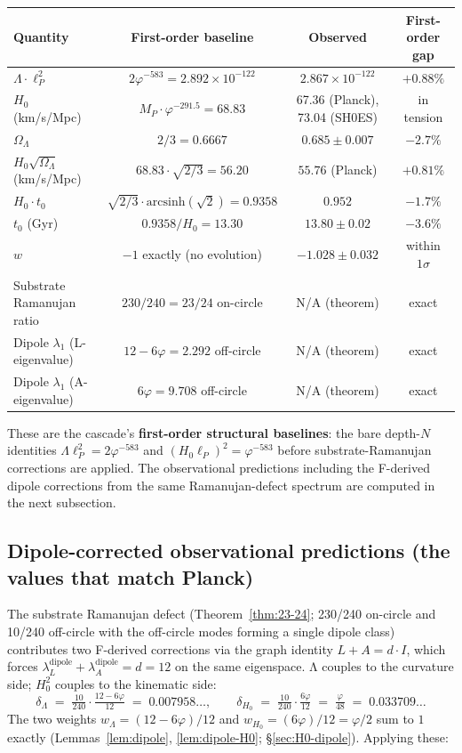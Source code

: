 \documentclass[11pt]{article}
\theoremstyle{plain}
\theoremstyle{definition}
\theoremstyle{remark}
\begin{document}
\begin{center}
\renewcommand{\arraystretch}{1.25}
\begin{tabular}{lccc}
\toprule
Quantity & First-order baseline & Observed & First-order gap \\
\midrule
$\Lambda \cdot \ell_P^2$ & $2\varphi^{-583} = 2.892 \times 10^{-122}$ & $2.867 \times 10^{-122}$ & $+0.88\%$ \\
$H_0$ (km/s/Mpc) & $M_P \cdot \varphi^{-291.5} = 68.83$ & 67.36 (Planck), 73.04 (SH0ES) & in tension \\
$\Omega_\Lambda$ & $2/3 = 0.6667$ & $0.685 \pm 0.007$ & $-2.7\%$ \\
$H_0 \sqrt{\Omega_\Lambda}$ (km/s/Mpc) & $68.83 \cdot \sqrt{2/3} = 56.20$ & $55.76$ (Planck) & $+0.81\%$ \\
$H_0 \cdot t_0$ & $\sqrt{2/3} \cdot \mathrm{arcsinh}(\sqrt{2}) = 0.9358$ & $0.952$ & $-1.7\%$ \\
$t_0$ (Gyr) & $0.9358 / H_0 = 13.30$ & $13.80 \pm 0.02$ & $-3.6\%$ \\
$w$ & $-1$ exactly (no evolution) & $-1.028 \pm 0.032$ & within $1\sigma$ \\
Substrate Ramanujan ratio & $230/240 = 23/24$ on-circle & N/A (theorem) & exact \\
Dipole $\lambda_1$ (L-eigenvalue) & $12 - 6\varphi = 2.292$ off-circle & N/A (theorem) & exact \\
Dipole $\lambda_1$ (A-eigenvalue) & $6\varphi = 9.708$ off-circle & N/A (theorem) & exact \\
\bottomrule
\end{tabular}
\end{center}

These are the cascade's \textbf{first-order structural baselines}: the bare depth-$N$ identities $\Lambda \ell_P^2 = 2\varphi^{-583}$ and $(H_0 \ell_P)^2 = \varphi^{-583}$ before substrate-Ramanujan corrections are applied. The observational predictions including the F-derived dipole corrections from the same Ramanujan-defect spectrum are computed in the next subsection.

\subsection{Dipole-corrected observational predictions (the values that match Planck)}\label{app:dipole-corrected}

The substrate Ramanujan defect (Theorem~\ref{thm:23-24}; 230/240 on-circle and 10/240 off-circle with the off-circle modes forming a single dipole class) contributes two F-derived corrections via the graph identity $L + A = d \cdot I$, which forces $\lambda_L^\mathrm{dipole} + \lambda_A^\mathrm{dipole} = d = 12$ on the same eigenspace. Λ couples to the curvature side; $H_0^2$ couples to the kinematic side:
\[
  \delta_\Lambda \;=\; \tfrac{10}{240} \cdot \tfrac{12 - 6\varphi}{12} \;=\; 0.007958\ldots, \qquad
  \delta_{H_0} \;=\; \tfrac{10}{240} \cdot \tfrac{6\varphi}{12} \;=\; \tfrac{\varphi}{48} \;=\; 0.033709\ldots
\]
The two weights $w_\Lambda = (12-6\varphi)/12$ and $w_{H_0} = (6\varphi)/12 = \varphi/2$ sum to $1$ exactly (Lemmas~\ref{lem:dipole}, \ref{lem:dipole-H0}; \S\ref{sec:H0-dipole}). Applying these:
\end{document}
